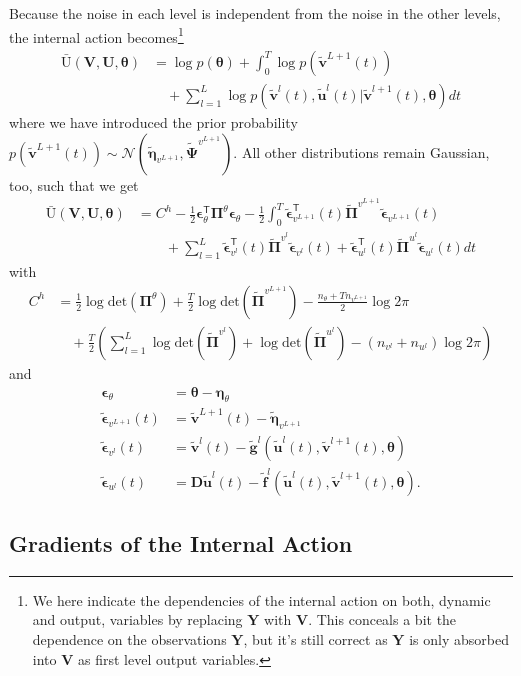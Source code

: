 \documentclass[a4paper,10pt]{article}
\newcommand{\bs}[1]{\mathbf{#1}}					%
\newcommand{\bgs}[1]{\boldsymbol{#1}}				%
\newcommand{\tr}{\mathsf{T}}				%
\newcommand{\gc}[1]{\tilde{#1}} %
\renewcommand{\ss}{u}         %
\newcommand{\sv}{v}         %
\newcommand{\spe}{\epsilon} %
\renewcommand{\sp}{\theta}    %
\newcommand{\ps}{\bs{\ss}}    %
\newcommand{\pv}{\bs{\sv}}    %
\newcommand{\ppe}{\bgs{\spe}} %
\newcommand{\psg}{\gc{\ps}}    %
\newcommand{\pvg}{\gc{\pv}}    %
\newcommand{\ppeg}{\gc{\ppe}} %
\newcommand{\pp}{\bgs{\sp}} %
\newcommand{\Ps}{\bs{U}}    %
\newcommand{\Po}{\bs{Y}}    %
\newcommand{\Pv}{\bs{V}}    %
\newcommand{\D}{\bs{D}}				%
\newcommand{\Ua}{\bar{\mathrm{U}}}		%
\newcommand{\N}{\mathcal{N}}			%
\renewcommand{\det}[1]{\mathrm{det}(#1)}	%
\begin{document}
Because the noise in each level is independent from the noise in the other levels, the internal action becomes\footnote{We here indicate the dependencies of the internal action on both, dynamic and output, variables by replacing $\Po$ with $\Pv$. This conceals a bit the dependence on the observations $\Po$, but it's still correct as $\Po$ is only absorbed into $\Pv$ as first level output variables.}
\begin{align}
    \Ua(\Pv,\Ps,\pp) &= \log p(\pp) + \int_0^T \log p(\pvg^{L+1}(t))\nonumber\\
    &\quad + \sum_{l=1}^L \log p(\pvg^{l}(t),\psg^l(t)|\pvg^{l+1}(t),\pp)dt
\end{align}
where we have introduced the prior probability $p(\pvg^{L+1}(t)) \sim \N(\gc{\bgs{\eta}}_{\sv^{L+1}},\gc{\bgs{\Psi}}^{\sv^{L+1}})$. All other distributions remain Gaussian, too, such that we get
\begin{align}\label{eq:intActionHier}
    \Ua(\Pv,\Ps,\pp) &= C^h  - \frac{1}{2}\ppe_\sp^\tr\bgs{\Pi}^{\sp}\ppe_\sp - \frac{1}{2}\int_0^T \ppeg_{\sv^{L+1}}^\tr(t)\gc{\bgs{\Pi}}^{\sv^{L+1}}\ppeg_{\sv^{L+1}}(t)\nonumber\\
    &\qquad + \sum_{l=1}^L \ppeg_{\sv^l}^\tr(t)\gc{\bgs{\Pi}}^{\sv^l}\ppeg_{\sv^l}(t) + \ppeg_{\ss^l}^\tr(t)\gc{\bgs{\Pi}}^{\ss^l}\ppeg_{\ss^l}(t)  dt
\end{align}
with
\begin{align}
    C^h &= \frac{1}{2}\log\det{\bgs{\Pi}^{\sp}} + \frac{T}{2}\log\det{\gc{\bgs{\Pi}}^{\sv^{L+1}}} - \frac{n_\sp + Tn_{\sv^{L+1}}}{2}\log 2\pi\nonumber\\
    &\quad + \frac{T}{2} \left( \sum_{l=1}^L \log\det{\gc{\bgs{\Pi}}^{\sv^l}} + \log\det{\gc{\bgs{\Pi}}^{\ss^l}} - (n_{\sv^l} + n_{\ss^l})\log 2\pi \right)
\end{align}
and
\begin{align}
    \ppe_\sp &= \pp - \bgs{\eta}_\sp\\
    \ppeg_{\sv^{L+1}}(t) &= \pvg^{L+1}(t) - \gc{\bgs{\eta}}_{\sv^{L+1}}\\
    \ppeg_{\sv^l}(t) &= \pvg^l(t) - \gc{\bs{g}}^l(\psg^l(t),\pvg^{l+1}(t),\pp)\\
    \ppeg_{\ss^l}(t) &= \D\psg^l(t) - \gc{\bs{f}}^l(\psg^l(t),\pvg^{l+1}(t),\pp).
\end{align}


\subsection{Gradients of the Internal Action}
\end{document}
